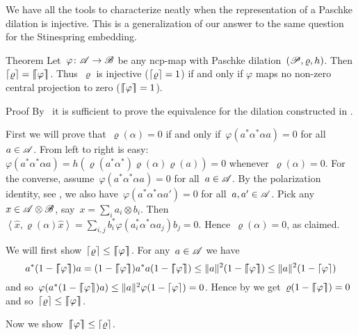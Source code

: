 \documentclass[b]{subfiles}
\begin{document}
\begin{parsec}%
\begin{point}%
We have all the tools to characterize neatly when
    the representation of a Paschke dilation is injective.
This is a generalization of our answer\cite{stineinj}
    to the same question for the Stinespring embedding.
\end{point}
\begin{point}{Theorem}%
Let~$\varphi\colon \mathscr{A} \to \mathscr{B}$ be any ncp-map
    with Paschke dilation~$(\mathscr{P}, \varrho, h)$.
Then $\left\lceil\varrho\right\rceil = \left\lceil\!\!\left\lceil\varphi\right\rceil\!\!\right\rceil$.
Thus~$\varrho$ is injective ($\left\lceil\varrho\right\rceil=1$) if and only if $\varphi$
maps no non-zero central projection to zero ($\left\lceil\!\!\left\lceil\varphi\right\rceil\!\!\right\rceil=1$).
\begin{point}{Proof}%
By~
    it is sufficient to prove the equivalence
    for the dilation constructed in .
\begin{point}%
First we will prove that~$\varrho(\alpha) = 0$
    if and only if~$\varphi(a^*\alpha^*\alpha a) = 0$
    for all~$a \in \mathscr{A}$.
From left to right is easy:
$\varphi(a^*\alpha^*\alpha a) = h(\varrho(a^*\alpha^*) \varrho(\alpha) \varrho(a)) = 0$ whenever~$\varrho(\alpha) = 0$.
For the converse, assume~$\varphi(a^*\alpha^*\alpha a) = 0$
    for all~$a \in \mathscr{A}$.
By the polarization identity, see ,
    we also have~$\varphi(a^* \alpha^* \alpha a') = 0$
    for all~$a,a' \in \mathscr{A}$.
Pick any~$x \in \mathscr{A} \otimes \mathscr{B}$, say~$x = \sum_i a_i \otimes b_i$.
Then
    $\left<\hat{x}, \varrho(\alpha) \hat{x}\right> = 
        \sum_{i,j} b_i^*\varphi(a_i^* \alpha^*\alpha a_j)b_j = 0$.
Hence~$\varrho(\alpha) = 0$, as claimed.
\end{point}
\begin{point}%
We will first show~$\left\lceil\varrho\right\rceil \leq \left\lceil\!\!\left\lceil\varphi\right\rceil\!\!\right\rceil$.
For any~$a \in \mathscr{A}$
we have
\begin{equation*}
    a^* (1 - \cceil{\varphi}) a = 
    (1 - \cceil{\varphi})a^* a (1 - \cceil{\varphi}) \leq
    \| a\|^2 (1 - \cceil{\varphi}) \leq \|a\|^2 (1 - \ceil{\varphi})
\end{equation*}
and so~$\varphi(a^* (1 - \left\lceil\!\!\left\lceil\varphi\right\rceil\!\!\right\rceil) a)
\leq \|a\|^2 \varphi(1-\left\lceil\varphi\right\rceil) = 0$.
Hence by 
we get~$\varrho(1-\left\lceil\!\!\left\lceil\varphi\right\rceil\!\!\right\rceil) = 0$
and so~$\left\lceil\varrho\right\rceil \leq \left\lceil\!\!\left\lceil\varphi\right\rceil\!\!\right\rceil$.
\end{point}
\begin{point}%
Now we show~$\left\lceil\!\!\left\lceil\varphi\right\rceil\!\!\right\rceil \leq \left\lceil\varrho\right\rceil$.

\end{point}
\end{point}
\end{point}
\end{parsec}
\end{document}
